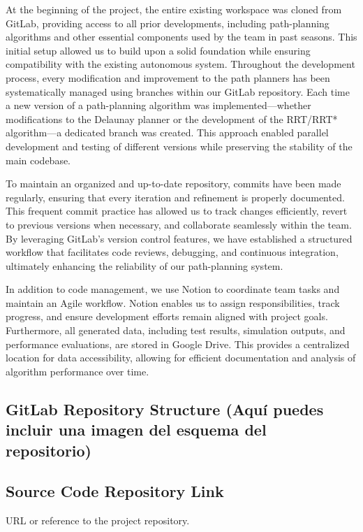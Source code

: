 \documentclass[a4paper,11pt]{report}
\begin{document}
At the beginning of the project, the entire existing workspace was cloned from GitLab, providing access to all prior developments, including path-planning algorithms and other essential components used by the team in past seasons. This initial setup allowed us to build upon a solid foundation while ensuring compatibility with the existing autonomous system. Throughout the development process, every modification and improvement to the path planners has been systematically managed using branches within our GitLab repository. Each time a new version of a path-planning algorithm was implemented—whether modifications to the Delaunay planner or the development of the RRT/RRT* algorithm—a dedicated branch was created. This approach enabled parallel development and testing of different versions while preserving the stability of the main codebase.

To maintain an organized and up-to-date repository, commits have been made regularly, ensuring that every iteration and refinement is properly documented. This frequent commit practice has allowed us to track changes efficiently, revert to previous versions when necessary, and collaborate seamlessly within the team. By leveraging GitLab's version control features, we have established a structured workflow that facilitates code reviews, debugging, and continuous integration, ultimately enhancing the reliability of our path-planning system.

In addition to code management, we use Notion to coordinate team tasks and maintain an Agile workflow. Notion enables us to assign responsibilities, track progress, and ensure development efforts remain aligned with project goals. Furthermore, all generated data, including test results, simulation outputs, and performance evaluations, are stored in Google Drive. This provides a centralized location for data accessibility, allowing for efficient documentation and analysis of algorithm performance over time.

\subsection{GitLab Repository Structure (Aquí puedes incluir una imagen del esquema del repositorio)}

\subsection{Source Code Repository Link}
URL or reference to the project repository.
\end{document}

